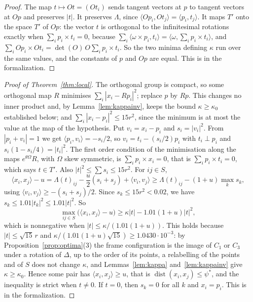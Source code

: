 \documentclass[12pt]{amsart}
\theoremstyle{definition}
\theoremstyle{plain}
\theoremstyle{definition}
\newcommand{\dist}{\operatorname{dist}}
\newcommand{\psis}{\psi^{*}}
\newcommand{\CI}{C_1}
\newcommand{\CIII}{C_3}
\begin{document}
\begin{proof}
The map $t\mapsto Ot=(Ot_i)$ sends tangent vectors at $p$ to tangent vectors at $Op$ and preserves $|t|$. It preserves $\Lambda$, since $\langle Op_i,Ot_j\rangle=\langle p_i,t_j\rangle$. It maps $T'$ onto the space $T'$ of $Op$: the vector $t$ is orthogonal to the infinitesimal rotations exactly when $\sum_ip_i\times t_i=0$, because $\sum_i\langle\omega\times p_i,t_i\rangle=\langle\omega,\sum_ip_i\times t_i\rangle$, and $\sum_iOp_i\times Ot_i=\det(O)\,O\sum_ip_i\times t_i$. So the two minima defining $\kappa$ run over the same values, and the constants of $p$ and $Op$ are equal. This is  in the formalization.
\end{proof}

\begin{proof}[Proof of Theorem~\ref{thm:local}]
The orthogonal group is compact, so some orthogonal map $R$ minimises $\sum_i|x_i-Rp_i|^2$; replace $p$ by $Rp$. This changes no inner product and, by Lemma~\ref{lem:kappainv}, keeps the bound $\kappa\ge\kappa_0$ established below; and $\sum_i|x_i-p_i|^2\le15r^2$, since the minimum is at most the value at the map of the hypothesis. Put $v_i=x_i-p_i$ and $s_i=|v_i|^2$. From $|p_i+v_i|=1$ we get $\langle p_i,v_i\rangle=-s_i/2$, so $v_i=t_i-(s_i/2)p_i$ with $t_i\perp p_i$ and $s_i(1-s_i/4)=|t_i|^2$. The first order condition of the minimisation along the maps $e^{\theta\Omega}R$, with $\Omega$ skew symmetric, is $\sum_ip_i\times x_i=0$, that is $\sum_ip_i\times t_i=0$, which says $t\in T'$. Also $|t|^2\le\sum s_i\le15r^2$. For $ij\in S$,
\[
\langle x_i,x_j\rangle-u=\Lambda(t)_{ij}-\frac u2(s_i+s_j)+\langle v_i,v_j\rangle\ge \Lambda(t)_{ij}-(1+u)\max_ks_k ,
\]
using $\langle v_i,v_j\rangle\ge-(s_i+s_j)/2$. Since $s_k\le15r^2<0.02$, we have $s_k\le1.01|t_k|^2\le1.01|t|^2$. So
\[
\max_{ij\in S}\bigl(\langle x_i,x_j\rangle-u\bigr)\ge\kappa|t|-1.01(1+u)|t|^2 ,
\]
which is nonnegative when $|t|\le\kappa/(1.01(1+u))$. This holds because $|t|\le\sqrt{15}\,r$ and $\kappa/(1.01(1+u)\sqrt{15})\ge1.0430\cdot10^{-3}$: by Proposition~\ref{prop:optima}(3) the frame configuration is the image of $\CI$ or $\CIII$ under a rotation of $\Delta$, up to the order of its points, a relabelling of the points and of $S$ does not change $\kappa$, and Lemmas~\ref{lem:kappa} and~\ref{lem:kappainv} give $\kappa\ge\kappa_0$. Hence some pair has $\langle x_i,x_j\rangle\ge u$, that is $\dist(x_i,x_j)\le\psis$, and the inequality is strict when $t\ne0$. If $t=0$, then $s_k=0$ for all $k$ and $x_i=p_i$. This is  in the formalization.
\end{proof}
\end{document}
